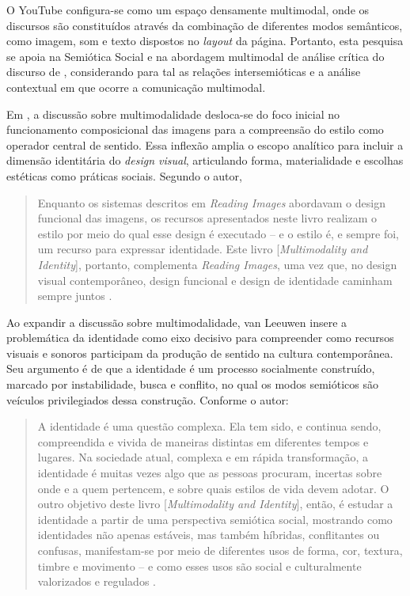 \documentclass[portuguese]{textolivre}
\begin{document}
O YouTube configura-se como um espaço densamente multimodal, onde os discursos são constituídos através da combinação de diferentes modos semânticos, como imagem, som e texto dispostos no \textit{layout} da página. Portanto, esta pesquisa se apoia na Semiótica Social e na abordagem multimodal de análise crítica do discurso de \textcite{KressVanLeeuwen2020ReadingImages}, considerando para tal as relações intersemióticas e a análise contextual em que ocorre a comunicação multimodal.

Em \textcite{VanLeeuwen2022MultimodalityIdentity}, a discussão sobre multimodalidade desloca-se do foco inicial no funcionamento composicional das imagens para a compreensão do estilo como operador central de sentido. Essa inflexão amplia o escopo analítico para incluir a dimensão identitária do \textit{design visual}, articulando forma, materialidade e escolhas estéticas como práticas sociais. Segundo o autor,

\begin{quote}
    Enquanto os sistemas descritos em \textit{Reading Images} abordavam o design funcional das imagens, os recursos apresentados neste livro realizam o estilo por meio do qual esse design é executado – e o estilo é, e sempre foi, um recurso para expressar identidade. Este livro [\textit{Multimodality and Identity}], portanto, complementa \textit{Reading Images}, uma vez que, no design visual contemporâneo, design funcional e design de identidade caminham sempre juntos \cite[p. 3, tradução própria]{VanLeeuwen2022MultimodalityIdentity}.
\end{quote}

Ao expandir a discussão sobre multimodalidade, van Leeuwen insere a problemática da identidade como eixo decisivo para compreender como recursos visuais e sonoros participam da produção de sentido na cultura contemporânea. Seu argumento é de que a identidade é um processo socialmente construído, marcado por instabilidade, busca e conflito, no qual os modos semióticos são veículos privilegiados dessa construção. Conforme o autor:

\begin{quote}
    A identidade é uma questão complexa. Ela tem sido, e continua sendo, compreendida e vivida de maneiras distintas em diferentes tempos e lugares. Na sociedade atual, complexa e em rápida transformação, a identidade é muitas vezes algo que as pessoas procuram, incertas sobre onde e a quem pertencem, e sobre quais estilos de vida devem adotar. O outro objetivo deste livro [\textit{Multimodality and Identity}], então, é estudar a identidade a partir de uma perspectiva semiótica social, mostrando como identidades não apenas estáveis, mas também híbridas, conflitantes ou confusas, manifestam-se por meio de diferentes usos de forma, cor, textura, timbre e movimento – e como esses usos são social e culturalmente valorizados e regulados \cite[p. 3, tradução própria]{VanLeeuwen2022MultimodalityIdentity}.
\end{quote}
\end{document}
